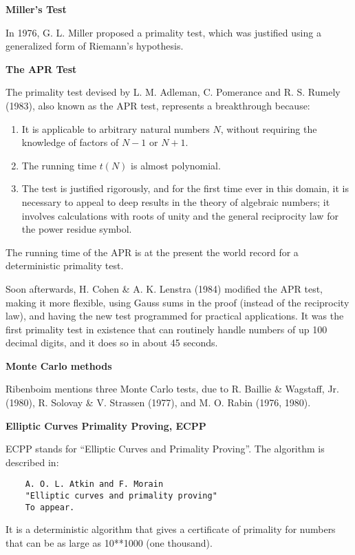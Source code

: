 {\bf Miller's Test}

In 1976, G. L. Miller proposed a primality test, which was justified
using a generalized form of Riemann's hypothesis.

{\bf The APR Test}

The primality test devised by L. M. Adleman, C. Pomerance and R. S.
Rumely (1983), also known as the APR test, represents a breakthrough
because:

\begin{enumerate}
  \item It is applicable to arbitrary natural numbers $N$, without
  requiring the knowledge of factors of $N - 1$ or $N + 1$.
  \item The running time $t(N)$ is almost polynomial.
  \item The test is justified rigorously, and for the first time ever in
  this domain, it is necessary to appeal to deep results in the theory
  of algebraic numbers; it involves calculations with roots of unity and
  the general reciprocity law for the power residue symbol.
\end{enumerate}

The running time of the APR is at the present the world record for a
deterministic primality test.

Soon afterwards, H. Cohen \& A. K. Lenstra (1984) modified the APR test,
making it more flexible, using Gauss sums in the proof (instead of the
reciprocity law), and having the new test programmed for practical
applications. It was the first primality test in existence that can
routinely handle numbers of up 100 decimal digits, and it does so in
about 45 seconds.

{\bf Monte Carlo methods}

Ribenboim mentions three Monte Carlo tests, due to R. Baillie \&
Wagstaff, Jr. (1980), R. Solovay \& V. Strassen (1977), and M. O. Rabin
(1976, 1980).

{\bf Elliptic Curves Primality Proving, ECPP}

ECPP stands for ``Elliptic Curves and Primality Proving''. The algorithm
is described in:

\begin{verbatim}
    A. O. L. Atkin and F. Morain
    "Elliptic curves and primality proving"
    To appear.
\end{verbatim}

It is a deterministic algorithm that gives a certificate of primality
for numbers that can be as large as 10**1000 (one thousand).

